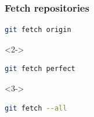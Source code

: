 \documentclass[hyperref={pdfpagelabels=false}]{beamer}
\begin{document}
\begin{frame}[fragile]
\frametitle{Fetch repositories}
\begin{figure}
\end{figure}
	\begin{lstlisting}[language=bash]
	git fetch origin
	\end{lstlisting}
	\begin{onlyenv}<2->
	\begin{lstlisting}[language=bash]
	git fetch perfect
	\end{lstlisting}
	\end{onlyenv}
	\begin{onlyenv}<3->
	\begin{lstlisting}[language=bash]
		git fetch --all
	\end{lstlisting}
	\end{onlyenv}
\end{frame}
\end{document}
